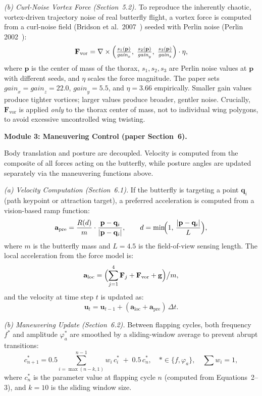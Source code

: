 \documentclass[12pt]{article}
\begin{document}
\textit{(b) Curl-Noise Vortex Force (Section~5.2).}
To reproduce the inherently chaotic, vortex-driven trajectory noise of real
butterfly flight, a vortex force is computed from a curl-noise field
(Bridson et al.\ 2007~\cite{Bridson2007}) seeded with Perlin noise
(Perlin 2002~\cite{Perlin2002}):
\[
  \mathbf{F}_{\mathrm{vor}}
  = \nabla \times
    \Bigl(\tfrac{s_1(\mathbf{p})}{\textit{gain}_x},\;
          \tfrac{s_2(\mathbf{p})}{\textit{gain}_y},\;
          \tfrac{s_3(\mathbf{p})}{\textit{gain}_z}\Bigr)\cdot\eta,
\]
where $\mathbf{p}$ is the center of mass of the thorax, $s_1, s_2, s_3$ are
Perlin noise values at $\mathbf{p}$ with different seeds, and $\eta$ scales the
force magnitude. The paper sets $\textit{gain}_x = \textit{gain}_z = 22.0$,
$\textit{gain}_y = 5.5$, and $\eta = 3.66$ empirically. Smaller gain values
produce tighter vortices; larger values produce broader, gentler noise. Crucially,
$\mathbf{F}_{\mathrm{vor}}$ is applied \emph{only} to the thorax center of mass,
not to individual wing polygons, to avoid excessive uncontrolled wing twisting.

\textbf{Module 3: Maneuvering Control (paper Section~6).}

Body translation and posture are decoupled. Velocity is computed from the
composite of all forces acting on the butterfly, while posture angles are updated
separately via the maneuvering functions above.

\textit{(a) Velocity Computation (Section~6.1).}
If the butterfly is targeting a point $\mathbf{q}_i$ (path keypoint or
attraction target), a preferred acceleration is computed from a vision-based
ramp function:
\[
  \mathbf{a}_{\mathrm{pre}} = \frac{R(d)}{m}\cdot\frac{\mathbf{p}-\mathbf{q}_i}{|\mathbf{p}-\mathbf{q}_i|},
  \qquad
  d = \min\!\Bigl(1,\,\frac{|\mathbf{p}-\mathbf{q}_i|}{L}\Bigr),
\]
where $m$ is the butterfly mass and $L = 4.5$ is the field-of-view sensing
length. The local acceleration from the force model is:
\[
  \mathbf{a}_{\mathrm{loc}}
  = \Bigl(\sum_{j=1}^{4}\mathbf{F}_j + \mathbf{F}_{\mathrm{vor}} + \mathbf{g}\Bigr)\big/m,
\]
and the velocity at time step $t$ is updated as:
\[
  \mathbf{u}_t = \mathbf{u}_{t-1} + (\mathbf{a}_{\mathrm{loc}} + \mathbf{a}_{\mathrm{pre}})\,\Delta t.
\]

\textit{(b) Maneuvering Update (Section~6.2).}
Between flapping cycles, both frequency $f^*$ and amplitude $\varphi_a^*$ are
smoothed by a sliding-window average to prevent abrupt transitions:
\[
  c^*_{n+1}
  = 0.5\!\sum_{i=\max(n-k,1)}^{n-1} w_i\,c^*_i \;+\; 0.5\,c^*_n,
  \quad * \in \{f, \varphi_a\},\quad \sum w_i = 1,
\]
where $c^*_n$ is the parameter value at flapping cycle $n$ (computed from
Equations~2--3), and $k = 10$ is the sliding window size.
\end{document}
